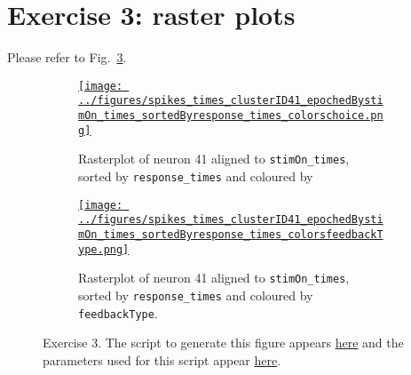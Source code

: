 \documentclass[12pt]{article}
\def\fig_width{3.5in}
\begin{document}
\section*{Exercise 3: raster plots}

Please refer to Fig.~\ref{fig:ex3}.

\begin{figure}[H]
    \begin{center}

        \begin{subfigure}{1.0\textwidth}
            \centering
            \href{https://www.gatsby.ucl.ac.uk/~rapela/neuroinformatics/2023/ws1/figures/spikes_times_clusterID41_epochedBystimOn_times_sortedByresponse_times_colorschoice.html}{\texttt{[image: ../figures/spikes\_times\_clusterID41\_epochedBystimOn\_times\_sortedByresponse\_times\_colorschoice.png]}}

            \caption{Rasterplot of neuron 41 aligned to
            \texttt{stimOn\_times},
            sorted by
            \texttt{response\_times}
            and coloured by
            }

            \label{fig:ex3_1}
        \end{subfigure}

        \begin{subfigure}{1.0\textwidth}
            \centering
            \href{https://www.gatsby.ucl.ac.uk/~rapela/neuroinformatics/2023/ws1/figures/spikes_times_clusterID41_epochedBystimOn_times_sortedByresponse_times_colorsfeedbackType.html}{\texttt{[image: ../figures/spikes\_times\_clusterID41\_epochedBystimOn\_times\_sortedByresponse\_times\_colorsfeedbackType.png]}}

            \caption{Rasterplot of neuron 41 aligned to
            \texttt{stimOn\_times},
            sorted by
            \texttt{response\_times}
            and coloured by
            \texttt{feedbackType}.
            }

            \label{fig:ex3_2}
        \end{subfigure}

        \caption{Exercise 3. The script to generate this figure appears
        \href{https://github.com/joacorapela/neuroinformatics23/blob/master/worksheets/ws1/mySolution/code/scripts/doPlotEpochedSpikesTimes.py}{here}
        and the parameters used for this script appear
        \href{https://github.com/joacorapela/neuroinformatics23/blob/master/worksheets/ws1/mySolution/code/scripts/doPlotEpochedSpikesTimes.csh}{here}.
        }

        \label{fig:ex3}


    \end{center}
\end{figure}
\end{document}
